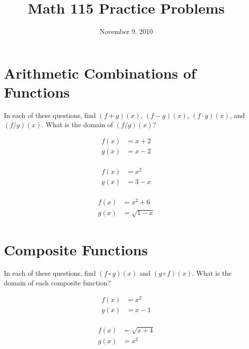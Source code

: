 \documentclass[fleqn,addpoints]{exam}
\title{Math 115 Practice Problems}
\date{November 9, 2010}
\begin{document}
\maketitle

\section{Arithmetic Combinations of Functions}

In each of these questions, find $(f+g)(x)$, $(f-g)(x)$, $(f \cdot g)(x)$, and $(f/g)(x)$.  What is the domain of $(f/g)(x)$?
\begin{questions}

\question 
\begin{align*}
  f(x) &= x+2 \\
  g(x) &= x-2 \\
\end{align*}

\vspace{2.5 cm}

\question 
\begin{align*}
  f(x) &= x^2 \\
  g(x) &= 3-x \\
\end{align*}

\vspace{2.5 cm}

\question 
\begin{align*}
  f(x) &= x^2+6 \\
  g(x) &= \sqrt{1-x} \\
\end{align*}

\vspace{2.5 cm}


\pagebreak

\section{Composite Functions}

In each of these questions, find $(f \circ g)(x)$ and $(g \circ f)(x)$.  What is the domain of each composite function?

\question 
\begin{align*}
  f(x) &= x^2 \\
  g(x) &= x-1 \\
\end{align*}
\vspace{2 cm}

\question 
\begin{align*}
  f(x) &= \sqrt{x+4} \\
  g(x) &= x^2 \\
\end{align*}
\vspace{2 cm}


\end{questions}
\end{document}
